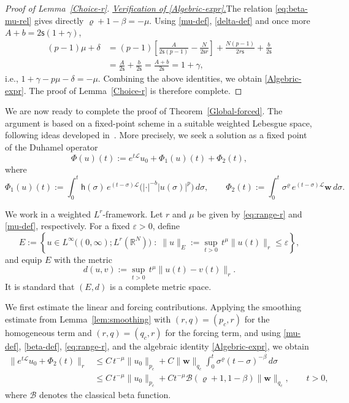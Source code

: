 \documentclass[12pt,reqno]{amsart}
\theoremstyle{plain}
\theoremstyle{definition}
\theoremstyle{remark}
\numberwithin{equation}{section}
\newcommand{\sL}{\mathscr{L}}
\newcommand{\h}{\mathsf h}
\newcommand{\ts}{\mathsf{s}}
\begin{document}
\begin{proof}[Proof of Lemma~\ref{Choice-r}]
\textit{\underline{Verification of \eqref{Algebric-expr}.}}\quad The relation \eqref{eq:beta-mu-rel} gives directly $\varrho+1-\beta=-\mu$. Using \eqref{mu-def}, \eqref{delta-def} and once more $A+b=2\ts(1+\gamma)$,
\begin{align*}
(p-1)\mu+\delta
&=(p-1)\!\left[\frac{A}{2\ts(p-1)}-\frac{N}{2\ts r}\right]+\frac{N(p-1)}{2r\ts}+\frac{b}{2\ts}\\
&=\frac{A}{2\ts}+\frac{b}{2\ts}=\frac{A+b}{2\ts}=1+\gamma,
\end{align*}
i.e., $1+\gamma-p\mu-\delta=-\mu$. Combining the above identities, we obtain \eqref{Algebric-expr}. 
The proof of Lemma~\ref{Choice-r} is therefore complete.
\end{proof}
\medskip


We are now ready to complete the proof of Theorem~\ref{Global-forced}. 
The argument is based on a fixed-point scheme in a suitable weighted Lebesgue space, following ideas developed in~\cite{Caz, JKS, Majd, Beri-arXiv}. 
More precisely, we seek a solution as a fixed point of the Duhamel operator
\begin{equation}\label{eq:Phi-def}
\Phi(u)(t) := e^{t\sL}u_{0} + \Phi_{1}(u)(t) + \Phi_{2}(t),
\end{equation}
where
\[
\Phi_{1}(u)(t) := \int_{0}^{t}\!\h(\sigma)\, e^{(t-\sigma)\sL}\bigl(|\cdot|^{-b}|u(\sigma)|^{p}\bigr)\, d\sigma,
\qquad
\Phi_{2}(t) := \int_{0}^{t}\!\sigma^{\varrho}\, e^{(t-\sigma)\sL}\mathbf{w}\,d\sigma.
\]

We work in a weighted $L^{r}$-framework. Let $r$ and $\mu$ be given by \eqref{eq:range-r} and \eqref{mu-def}, respectively. For a fixed $\varepsilon > 0$, define
\[
E := \left\{  u \in L^{\infty}\bigl((0,\infty); L^{r}(\mathbb{R}^{N})\bigr)\;:\; \|u\|_{E} := \sup_{t>0} \, t^{\mu}\|u(t)\|_{r} \leq \varepsilon \right\},
\]
and equip $E$ with the metric
\[
d(u,v) := \sup_{t>0} \, t^{\mu}\|u(t)-v(t)\|_{r}.
\]
It is standard that $(E,d)$ is a complete metric space.
\medskip

We first estimate the linear and forcing contributions. Applying the smoothing estimate from Lemma~\ref{lem:smoothing} with $(r,q) = (p_c,r)$ for the homogeneous term and $(r,q) = (q_c,r)$ for the forcing term, and using \eqref{mu-def}, \eqref{beta-def}, \eqref{eq:range-r}, and the algebraic identity \eqref{Algebric-expr}, we obtain
\begin{equation} \label{Est-LF}
\begin{aligned}
\|e^{t\mathcal{L}}u_{0}+\Phi_2(t)\|_{r}
&\le C\,t^{-\mu}\|u_{0}\|_{p_{c}}
   +C\|\mathbf{w}\|_{q_c}\int_0^t\sigma^{\varrho}(t-\sigma)^{-\beta}\, d\sigma \\
&\le  C\,t^{-\mu}\|u_{0}\|_{p_{c}}
   +Ct^{-\mu}\mathscr{B}\left(\varrho+1,1-\beta\right)\|\mathbf{w}\|_{q_c},
\qquad t>0,
\end{aligned}
\end{equation}
where $\mathscr{B}$ denotes the classical beta function.
\end{document}
